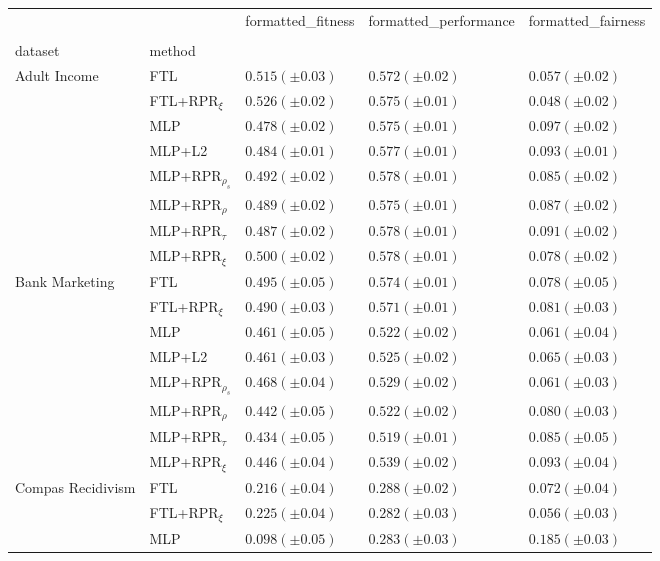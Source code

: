 \begin{tabular}{lllll}
\toprule
 &  & formatted_fitness & formatted_performance & formatted_fairness \\
 &  &  &  &  \\
dataset & method &  &  &  \\
\midrule
\multirow[t]{8}{*}{Adult Income} & FTL & $0.515 (\pm0.03)$ & $0.572 (\pm0.02)$ & $0.057 (\pm0.02)$ \\
 & FTL+RPR$_{\xi}$ & $0.526 (\pm0.02)$ & $0.575 (\pm0.01)$ & $0.048 (\pm0.02)$ \\
 & MLP & $0.478 (\pm0.02)$ & $0.575 (\pm0.01)$ & $0.097 (\pm0.02)$ \\
 & MLP+L2 & $0.484 (\pm0.01)$ & $0.577 (\pm0.01)$ & $0.093 (\pm0.01)$ \\
 & MLP+RPR$_{\rho_s}$ & $0.492 (\pm0.02)$ & $0.578 (\pm0.01)$ & $0.085 (\pm0.02)$ \\
 & MLP+RPR$_{\rho}$ & $0.489 (\pm0.02)$ & $0.575 (\pm0.01)$ & $0.087 (\pm0.02)$ \\
 & MLP+RPR$_{\tau}$ & $0.487 (\pm0.02)$ & $0.578 (\pm0.01)$ & $0.091 (\pm0.02)$ \\
 & MLP+RPR$_{\xi}$ & $0.500 (\pm0.02)$ & $0.578 (\pm0.01)$ & $0.078 (\pm0.02)$ \\
\cline{1-5}
\multirow[t]{8}{*}{Bank Marketing} & FTL & $0.495 (\pm0.05)$ & $0.574 (\pm0.01)$ & $0.078 (\pm0.05)$ \\
 & FTL+RPR$_{\xi}$ & $0.490 (\pm0.03)$ & $0.571 (\pm0.01)$ & $0.081 (\pm0.03)$ \\
 & MLP & $0.461 (\pm0.05)$ & $0.522 (\pm0.02)$ & $0.061 (\pm0.04)$ \\
 & MLP+L2 & $0.461 (\pm0.03)$ & $0.525 (\pm0.02)$ & $0.065 (\pm0.03)$ \\
 & MLP+RPR$_{\rho_s}$ & $0.468 (\pm0.04)$ & $0.529 (\pm0.02)$ & $0.061 (\pm0.03)$ \\
 & MLP+RPR$_{\rho}$ & $0.442 (\pm0.05)$ & $0.522 (\pm0.02)$ & $0.080 (\pm0.03)$ \\
 & MLP+RPR$_{\tau}$ & $0.434 (\pm0.05)$ & $0.519 (\pm0.01)$ & $0.085 (\pm0.05)$ \\
 & MLP+RPR$_{\xi}$ & $0.446 (\pm0.04)$ & $0.539 (\pm0.02)$ & $0.093 (\pm0.04)$ \\
\cline{1-5}
\multirow[t]{8}{*}{Compas Recidivism} & FTL & $0.216 (\pm0.04)$ & $0.288 (\pm0.02)$ & $0.072 (\pm0.04)$ \\
 & FTL+RPR$_{\xi}$ & $0.225 (\pm0.04)$ & $0.282 (\pm0.03)$ & $0.056 (\pm0.03)$ \\
 & MLP & $0.098 (\pm0.05)$ & $0.283 (\pm0.03)$ & $0.185 (\pm0.03)$ \\

\end{tabular}
